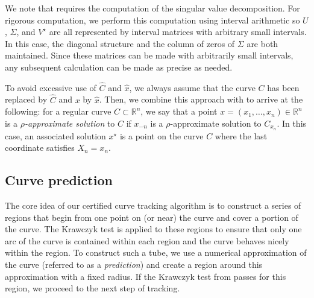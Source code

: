\begin{remark}
We note that  requires the computation of the singular value decomposition. For rigorous computation, we perform this computation using interval arithmetic so $U$, $\Sigma$, and $V^\star$ are all represented by interval matrices with arbitrary small intervals.  In this case, the diagonal structure and the column of zeros of $\Sigma$ are both maintained.  Since these matrices can be made with arbitrarily small intervals, any subsequent calculation can be made as precise as needed.
\end{remark}


To avoid excessive use of $\hat{C}$ and $\hat{x}$, we always assume that the curve $C$ has been replaced by $\hat{C}$ and $x$ by $\hat{x}$.  Then, we combine this approach with  to arrive at the following: for a regular curve $C\subset \mathbb{R}^n$, we say that a point $x=(x_1,\dots, x_n)\in \mathbb{R}^n$ is a \emph{$\rho$-approximate solution} to $C$ if $x_{-n}$ is a $\rho$-approximate solution to $C_{x_n}$. In this case, an associated solution $x^\star$ is a point on the curve $C$ where the last coordinate satisfies $X_n=x_n$.

\subsection{Curve prediction}

The core idea of our certified curve tracking algorithm is to construct a series of regions that begin from one point on (or near) the curve and cover a portion of the curve.
The Krawczyk test is applied to these regions to ensure that only one arc of the curve is contained within each region and the curve behaves nicely within the region. To construct such a tube, we use a numerical approximation of the curve (referred to as a \emph{prediction}) and create a region around this approximation with a fixed radius. If the Krawczyk test from  passes for this region, we proceed to the next step of tracking.

